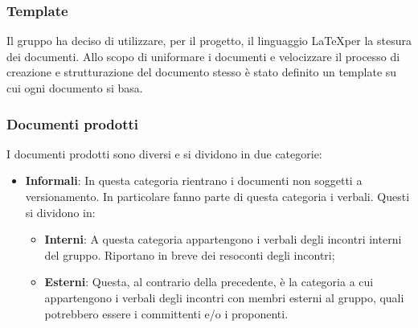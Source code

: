 \documentclass[../norme_di_progetto.tex]{subfiles}
\begin{document}
\subsubsection{Template}
Il gruppo ha deciso di utilizzare, per il progetto, il linguaggio \LaTeX per la stesura dei documenti. Allo scopo di uniformare i documenti e velocizzare il processo di creazione e strutturazione del documento stesso è stato definito un template su cui ogni documento si basa.

\subsubsection{Documenti prodotti}
I documenti prodotti sono diversi e si dividono in due categorie:
\begin{itemize}
    \item \textbf{Informali}: In questa categoria rientrano i documenti non soggetti a versionamento. In particolare fanno parte di questa categoria i verbali. Questi si dividono in:
    \begin{itemize}
        \item \textbf{Interni}: A questa categoria appartengono i verbali degli incontri interni del gruppo. Riportano in breve dei resoconti degli incontri;
        \item \textbf{Esterni}: Questa, al contrario della precedente, è la categoria a cui appartengono i verbali degli incontri con membri esterni al gruppo, quali potrebbero essere i committenti e/o i proponenti.
    \end{itemize}
    

\end{itemize}
\end{document}

